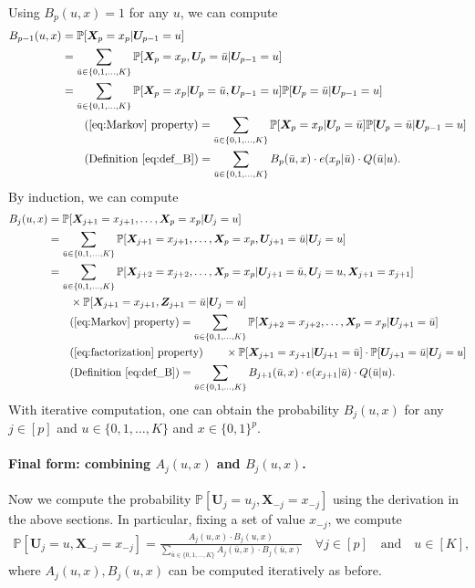 \documentclass[12pt]{article}
\theoremstyle{definition}
\def\P{\mathbb{P}}
\def\P{\mathbb{P}}
\renewcommand{\P}{\mathbb{P}}							%
\newcommand{\prx}{\bm X}								%
\newcommand{\prz}{\bm Z}								%
\newcommand{\pru}{{\bm U}}								%
\begin{document}
Using $B_p(u,x)=1$ for any $u$, we can compute 
\begin{align*}
	B_{p-1}(u,x)
	&
	=\P[\prx_{p}=x_p|\pru_{p-1}=u]\\
	&
	=\sum_{\bar u\in\{0,1,\ldots,K\}}\P[\prx_p=x_p,\pru_{p}=\bar u|\pru_{p-1}=u]\\
	&
	=\sum_{\bar u\in\{0,1,\ldots,K\}} \P[\prx_p=x_p|\pru_p=\bar u,\pru_{p-1}=u]\P[\pru_p=\bar u|\pru_{p-1}=u]\\
	&\tag{\ref{eq:Markov} property}
	=\sum_{\bar u\in\{0,1,\ldots,K\}} \P[\prx_p=x_p|\pru_p=\bar u]\P[\pru_p=\bar u|\pru_{p-1}=u]\\
	&\tag{Definition \eqref{eq:def_B}}
	=\sum_{\bar u\in\{0,1,\ldots,K\}} B_{p}(\bar u, x)\cdot e(x_p|\bar u)\cdot Q(\bar u|u).
\end{align*}
By induction, we can compute 
\begin{align*}
	B_{j}(u,x)
	&
	=\P[\bm X_{j+1}=x_{j+1},\ldots, \prx_{p}=x_{p}|\pru_{j}=u]\\
	&
	=\sum_{\bar u\in\{0,1,\ldots,K\}}\P[\bm X_{j+1}=x_{j+1},\ldots, \prx_{p}=x_{p},\pru_{j+1}=\bar u|\pru_{j}=u]\\
	&
	=\sum_{\bar u\in\{0,1,\ldots,K\}}\P[\prx_{j+2}=x_{j+2},\ldots, \prx_{p}=x_{p}|\pru_{j+1}=\bar u,\pru_{j}=u,\prx_{j+1}=x_{j+1}]\\
	&
	\qquad\times\P[\prx_{j+1}=x_{j+1},\prz_{j+1}=\bar u|\pru_{j}=u]\\
	&\tag{\ref{eq:Markov} property}
	=\sum_{\bar u\in\{0,1,\ldots,K\}}\P[\prx_{j+2}=x_{j+2},\ldots, \prx_{p}=x_{p}|\pru_{j+1}=\bar u]\\
	&\tag{\ref{eq:factorization} property}
	\qquad\times \P[\prx_{j+1}=x_{j+1}|\pru_{j+1}=\bar u]\cdot \P[\pru_{j+1}=\bar u|\pru_{j}=u]\\
	&\tag{Definition \eqref{eq:def_B}}
	=\sum_{\bar u\in\{0,1,\ldots,K\}}B_{j+1}(\bar u,x)\cdot e(x_{j+1}|\bar u)\cdot Q(\bar u|u).
\end{align*}
With iterative computation, one can obtain the probability $B_j(u,x)$ for any $j\in[p]$ and $u\in \{0,1,\ldots,K\}$ and $x\in\{0,1\}^p$.

\paragraph{Final form: combining $A_j(u,x)$ and $B_j(u,x)$.}

Now we compute the probability $\P[\pru_j=u_j,\prx_{-j}=x_{-j}]$ using the derivation in the above sections. In particular, fixing a set of value $x_{-j}$, we compute 
\begin{align*}
	\P[\pru_j=u,\prx_{-j}=x_{-j}]=\frac{A_j(u,x)\cdot B_j(u,x)}{\sum_{\bar u\in \{0,1,\ldots,K\}}A_j(\bar u,x)\cdot B_j(\bar u,x)}\quad\forall j\in[p]\quad\text{and}\quad u\in[K],
\end{align*}
where $A_j(u,x),B_j(u,x)$ can be computed iteratively as before.
\end{document}
